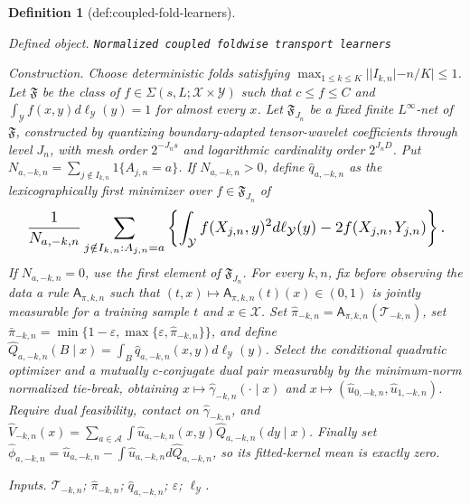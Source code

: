 \documentclass{article}
\newtheorem{definition}{Definition}
\begin{document}
\begin{definition}[def:coupled-fold-learners]\label{def:coupled-fold-learners}
\par\smallskip\noindent\emph{Defined object.} \texttt{Normalized coupled foldwise transport learners}
\par\smallskip\noindent\emph{Construction.} Choose deterministic folds satisfying \(\max_{1\le k\le K}||I_{k,n}|-n/K|\le1\). Let \(\mathfrak F\) be the class of \(f\in\Sigma(s,L;\mathcal X\times\mathcal Y)\) such that \(c\le f\le C\) and \(\int_{\mathcal Y}f(x,y)d\ell_{\mathcal Y}(y)=1\) for almost every \(x\). Let \(\mathfrak F_{J_n}\) be a fixed finite \(L^\infty\)-net of \(\mathfrak F\), constructed by quantizing boundary-adapted tensor-wavelet coefficients through level \(J_n\), with mesh order \(2^{-J_ns}\) and logarithmic cardinality order \(2^{J_nD}\). Put \(N_{a,-k,n}=\sum_{j\notin I_{k,n}}1\{A_{j,n}=a\}\). If \(N_{a,-k,n}>0\), define \(\widehat q_{a,-k,n}\) as the lexicographically first minimizer over \(f\in\mathfrak F_{J_n}\) of \[
\makebox[\linewidth][c]{\resizebox{0.98\linewidth}{!}{\par\noindent \makebox[\linewidth][c]{\resizebox{0.98\linewidth}{!}{\(\displaystyle \displaystyle \frac1{N_{a,-k,n}}\sum_{j\notin I_{k,n}:A_{j,n}=a}\left\{\int_{\mathcal Y}f(X_{j,n},y)^2d\ell_{\mathcal Y}(y)-2f(X_{j,n},Y_{j,n})\right\}.\)}}\par\noindent}}
\] If \(N_{a,-k,n}=0\), use the first element of \(\mathfrak F_{J_n}\). For every \(k,n\), fix before observing the data a rule \(\mathsf A_{\pi,k,n}\) such that \((t,x)\mapsto\mathsf A_{\pi,k,n}(t)(x)\in(0,1)\) is jointly measurable for a training sample \(t\) and \(x\in\mathcal X\). Set \(\widehat\pi_{-k,n}=\mathsf A_{\pi,k,n}(\mathcal T_{-k,n})\), set \(\bar\pi_{-k,n}=\min\{1-\varepsilon,\max\{\varepsilon,\widehat\pi_{-k,n}\}\}\), and define \(\widehat Q_{a,-k,n}(B\mid x)=\int_B\widehat q_{a,-k,n}(x,y)d\ell_{\mathcal Y}(y)\). Select the conditional quadratic optimizer and a mutually \(c\)-conjugate dual pair measurably by the minimum-norm normalized tie-break, obtaining \(x\mapsto\widehat\gamma_{-k,n}(\cdot\mid x)\) and \(x\mapsto(\widehat u_{0,-k,n},\widehat u_{1,-k,n})\). Require dual feasibility, contact on \(\widehat\gamma_{-k,n}\), and \(\widehat V_{-k,n}(x)=\sum_{a\in\mathcal A}\int\widehat u_{a,-k,n}(x,y)\widehat Q_{a,-k,n}(dy\mid x)\). Finally set \(\widehat\phi_{a,-k,n}=\widehat u_{a,-k,n}-\int\widehat u_{a,-k,n}d\widehat Q_{a,-k,n}\), so its fitted-kernel mean is exactly zero.
\par\smallskip\noindent\emph{Inputs.} \(\mathcal T_{-k,n}\); \(\widehat\pi_{-k,n}\); \(\widehat q_{a,-k,n}\); \(\varepsilon\); \(\ell_{\mathcal Y}\).
\end{definition}
\end{document}
